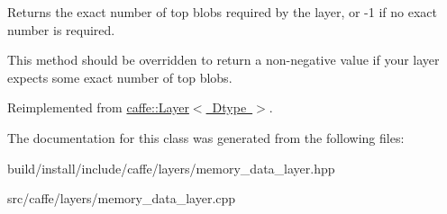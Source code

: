 Returns the exact number of top blobs required by the layer, or -\/1 if no exact number is required. 

This method should be overridden to return a non-\/negative value if your layer expects some exact number of top blobs. 

Reimplemented from \mbox{\hyperlink{classcaffe_1_1_layer_a64e2ca72c719e4b2f1f9216ccfb0d37f}{caffe\+::\+Layer$<$ Dtype $>$}}.



The documentation for this class was generated from the following files\+:\begin{DoxyCompactItemize}
\item 
build/install/include/caffe/layers/memory\+\_\+data\+\_\+layer.\+hpp\item 
src/caffe/layers/memory\+\_\+data\+\_\+layer.\+cpp\end{DoxyCompactItemize}
